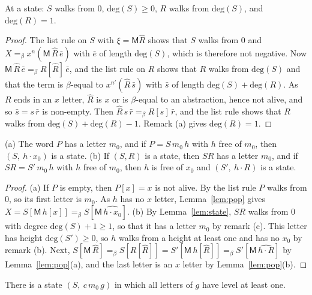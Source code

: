 \documentclass[a4paper,english]{lipics-v2021}
\newcommand{\M}{\mathsf{M}}
\newcommand{\eqb}{=_{\beta}}
\newcommand{\hatw}[1]{\widehat{#1}}
\newcommand{\dg}{\mathrm{deg}}
\begin{document}
\begin{lemma}\label{lem:state}
At a state: $S$ walks from $0$, $\dg(S) \geq 0$, $R$ walks from $\dg(S)$, and $\dg(R) = 1$.
\end{lemma}

\begin{proof}
The list rule on $S$ with $\xi = \M\hatw{R}$ shows that $S$ walks from $0$ and $X \eqb x^n(\M\,\hatw{R}\,\bar e)$ with $\bar e$ of length $\dg(S)$, which is therefore not negative. Now $\M\,\hatw{R}\,\bar e \eqb R[\hatw{R}]\,\bar e$, and the list rule on $R$ shows that $R$ walks from $\dg(S)$ and that the term is $\beta$-equal to $x^{n'}(\hatw{R}\,\bar s)$ with $\bar s$ of length $\dg(S) + \dg(R)$. As $R$ ends in an $x$ letter, $\hatw{R}$ is $x$ or is $\beta$-equal to an abstraction, hence not alive, and so $\bar s = s\,\bar r$ is non-empty. Then $\hatw{R}\,s\,\bar r \eqb R[s]\,\bar r$, and the list rule shows that $R$ walks from $\dg(S) + \dg(R) - 1$. Remark (a) gives $\dg(R) = 1$.
\end{proof}

\begin{lemma}\label{lem:next}
(a) The word $P$ has a letter $m_0$, and if $P = S\,m_0\,h$ with $h$ free of $m_0$, then $(S,\ h\cdot x_0)$ is a state. (b) If $(S,R)$ is a state, then $SR$ has a letter $m_0$, and if $SR = S'\,m_0\,h$ with $h$ free of $m_0$, then $h$ is free of $x_0$ and $(S',\ h\cdot R)$ is a state.
\end{lemma}

\begin{proof}
(a) If $P$ is empty, then $P[x] = x$ is not alive. By the list rule $P$ walks from $0$, so its first letter is $m_0$. As $h$ has no $x$ letter, Lemma~\ref{lem:pop} gives $X = S[\M\,h[x]] \eqb S[\M\,\widehat{h\cdot x_0}]$. (b) By Lemma~\ref{lem:state}, $SR$ walks from $0$ with degree $\dg(S)+1 \geq 1$, so that it has a letter $m_0$ by remark (c). This letter has height $\dg(S') \geq 0$, so $h$ walks from a height at least one and has no $x_0$ by remark (b). Next, $S[\M\,\hatw{R}] \eqb S[R[\hatw{R}]] = S'[\M\,h[\hatw{R}]] \eqb S'[\M\,\widehat{h\cdot R}]$ by Lemma~\ref{lem:pop}(a), and the last letter is an $x$ letter by Lemma~\ref{lem:pop}(b).
\end{proof}

\begin{lemma}\label{lem:run}
There is a state $(S,\ c\,m_0\,g)$ in which all letters of $g$ have level at least one.
\end{lemma}
\end{document}
